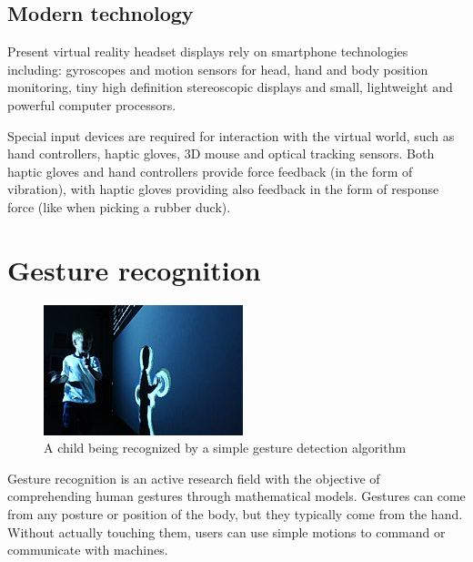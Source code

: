 \documentclass[12pt,a4paper,twoside]{report}
\begin{document}
\subsection{Modern technology}

Present virtual reality headset displays rely on smartphone technologies including: gyroscopes and motion sensors for head, hand and body position monitoring, tiny high definition stereoscopic displays and small, lightweight and powerful computer processors.

Special input devices are required for interaction with the virtual world, such as hand controllers, haptic gloves, 3D mouse and optical tracking sensors. Both haptic gloves and hand controllers provide force feedback (in the form of vibration), with haptic gloves providing also feedback in the form of response force (like when picking a rubber duck).

\section{Gesture recognition}

\begin{figure}
  \includegraphics[width=\linewidth]{img/GestRecog_child.jpg}
  \caption[]{A child being recognized by a simple gesture detection algorithm \footnotemark }
  \label{fig:child}
\end{figure}


Gesture recognition is an active research field with the objective of comprehending human gestures through mathematical models. Gestures can come from any posture or position of the body, but they typically come from the hand. Without actually touching them, users can use simple motions to command or communicate with machines.
\end{document}
